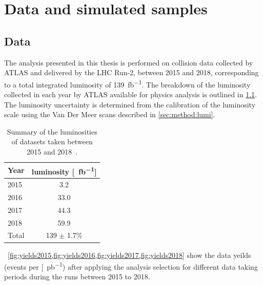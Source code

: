 \chapter{Data and simulated samples}\label{chap:datamc}

\section{Data}\label{sec:datamc:data}
The analysis presented in this thesis is performed on \emph{\protonproton} collision data collected by ATLAS and delivered by the LHC Run-2, between 2015 and 2018, corresponding to a total integrated luminosity of \SI{139}{\femto\barn^{-1}}. The breakdown of the luminosity collected in each year by ATLAS available for physics analysis is outlined in \cref{tab:data:lumi}. The luminosity uncertainty is determined from the calibration of the luminosity scale using the Van Der Meer scans described in \cref{sec:method:lumi}. 
\begin{table}[h]
    \centering
    \begin{tabular}{l|c}
        Year & luminosity [\SI{}{\femto\barn^{-1}}] \\
        \hline
        2015 & 3.2 \\
        2016 & 33.0 \\
        2017 & 44.3 \\
        2018 & 59.9 \\
        \hline 
        \hline
        Total & 139 $\pm$ 1.7\% \\
	\end{tabular}
    \caption[Summary of the luminosities of datasets taken between 2015 and 2018]{Summary of the luminosities of datasets taken between 2015 and 2018~\cite{ATLAS:lumiPlots}.}
    \label{tab:data:lumi}
  \end{table}

~\cref{fig:yields2015,fig:yields2016,fig:yields2017,fig:yields2018} show the data yeilds (events per [\SI{}{\pico\barn^{-1}}) after applying the analysis selection for different data taking periods during the runs between 2015 to 2018. 

